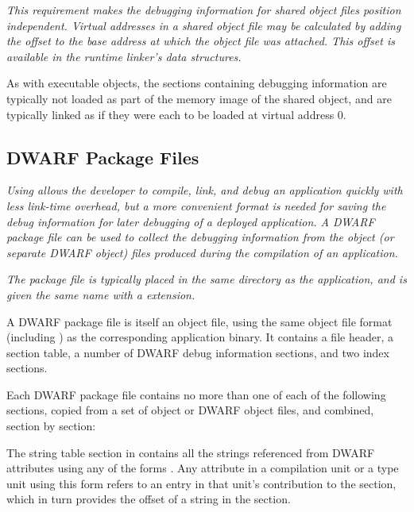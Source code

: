 \textit{This requirement makes the debugging information for
shared object files position independent.  Virtual addresses in a
shared object file may be calculated by adding the offset to the
base address at which the object file was attached. This offset
is available in the run\dash time linker\textquoteright s data structures.}

As with executable objects, the sections containing debugging
information are typically not loaded as part of the memory image
of the shared object, and are typically linked as if they were
each to be loaded at virtual address 0.

\subsection{DWARF Package Files}
\label{datarep:dwarfpackagefiles}
\textit{Using  allows the developer to compile, 
link, and debug an application quickly with less link-time overhead,
but a more convenient format is needed for saving the debug
information for later debugging of a deployed application. A
DWARF package file can be used to collect the debugging
information from the object (or separate DWARF object) files
produced during the compilation of an application.}

\textit{The package file is typically placed in the same directory as the
application, and is given the same name with a 
extension.}

A DWARF package file is itself an object file, using the
same object file format (including \byteorder) as the
corresponding application binary. It 
\bb
contains
\eb
a file header, a section table, a number of DWARF debug information
sections, and two index sections.

Each DWARF package file contains no more than one of each of the
following sections, copied from a set of object or DWARF object
files, and combined, section by section:
\begin{alltt}
    \dotdebuginfodwo
    \dotdebugabbrevdwo
    \dotdebuglinedwo
    \dotdebugloclistsdwo
    \dotdebugrnglistsdwo
    \dotdebugstroffsetsdwo
    \dotdebugstrdwo
    \dotdebugmacrodwo
\end{alltt}

The string table section in \dotdebugstrdwo{} contains all the
strings referenced from DWARF attributes using 
any of the forms
\DWFORMstrxXNor. Any attribute in a compilation unit or a type
unit using this form refers to an entry in that unit's
contribution to the \dotdebugstroffsetsdwo{} section, which in turn
provides the offset of a string in the \dotdebugstrdwo{}
section.

